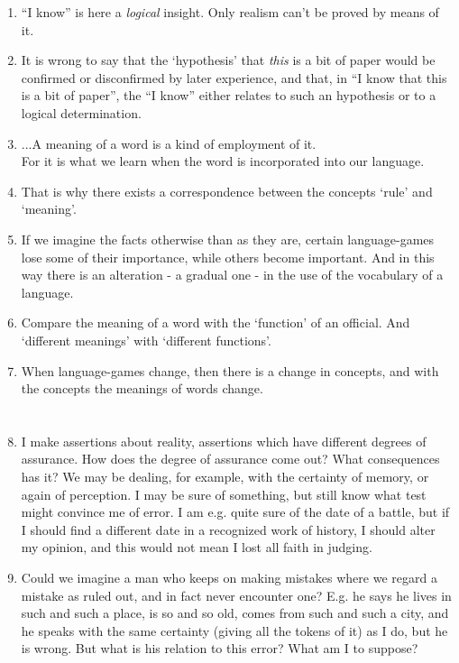 \documentclass{book}
\begin{document}
\begin{enumerate}
\item
``I know'' is here a \emph{logical} insight. Only realism can't be proved by
means of it.

\item
It is wrong to say that the `hypothesis' that \emph{this} is a bit of paper
would be confirmed or disconfirmed by later experience, and that, in ``I know
that this is a bit of paper'', the ``I know'' either relates to such an
hypothesis or to a logical determination.

\item
...A meaning of a word is a kind of employment of it. \\
For it is what we learn when the word is incorporated into our language.

\item
That is why there exists a correspondence between the concepts `rule' and
`meaning'.

\item
If we imagine the facts otherwise than as they are, certain language-games lose
some of their importance, while others become important. And in this way there
is an alteration - a gradual one - in the use of the vocabulary of a language.

\item
Compare the meaning of a word with the `function' of an official. And
`different meanings' with `different functions'.

\item
When language-games change, then there is a change in concepts, and with the
concepts the meanings of words change.

\chapter{}

\item
I make assertions about reality, assertions which have different degrees of
assurance. How does the degree of assurance come out? What consequences has it?
We may be dealing, for example, with the certainty of memory, or again of
perception. I may be sure of something, but still know what test might convince
me of error. I am e.g. quite sure of the date of a battle, but if I should find
a different date in a recognized work of history, I should alter my opinion,
and this would not mean I lost all faith in judging.

\item
Could we imagine a man who keeps on making mistakes where we regard a mistake
as ruled out, and in fact never encounter one?  E.g. he says he lives in such
and such a place, is so and so old, comes from such and such a city, and he
speaks with the same certainty (giving all the tokens of it) as I do, but he is
wrong.  But what is his relation to this error? What am I to suppose?


\end{enumerate}
\end{document}
